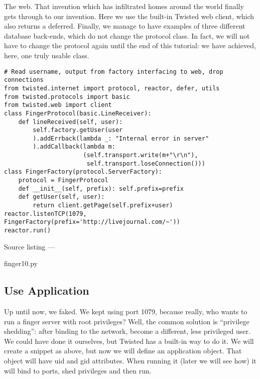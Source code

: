 The web. That invention which has infiltrated homes around the world finally gets through to our invention. Here we use the built-in Twisted web client, which also returns a deferred. Finally, we manage to have examples of three different database back-ends, which do not change the protocol class. In fact, we will not have to change the protocol again until the end of this tutorial: we have achieved, here, one truly usable class.\begin{verbatim}
# Read username, output from factory interfacing to web, drop connections
from twisted.internet import protocol, reactor, defer, utils
from twisted.protocols import basic
from twisted.web import client
class FingerProtocol(basic.LineReceiver):
    def lineReceived(self, user):
        self.factory.getUser(user
        ).addErrback(lambda _: "Internal error in server"
        ).addCallback(lambda m:
                      (self.transport.write(m+"\r\n"),
                       self.transport.loseConnection()))
class FingerFactory(protocol.ServerFactory):
    protocol = FingerProtocol
    def __init__(self, prefix): self.prefix=prefix
    def getUser(self, user):
        return client.getPage(self.prefix+user)
reactor.listenTCP(1079, FingerFactory(prefix='http://livejournal.com/~'))
reactor.run()
\end{verbatim}\parbox[b]{\linewidth}{\begin{center}Source listing --- \begin{em}finger10.py\end{em}\end{center}}

\subsection{Use Application}


Up until now, we faked. We kept using port 1079, because really, who wants to run a finger server with root privileges? Well, the common solution is ``privilege shedding'': after binding to the network, become a different, less privileged user. We could have done it ourselves, but Twisted has a built-in way to do it. We will create a snippet as above, but now we will define an application object. That object will have uid and gid attributes. When running it (later we will see how) it will bind to ports, shed privileges and then run.

